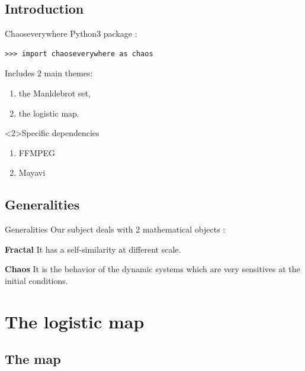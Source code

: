 \documentclass[11pt, compress, tikz]{beamer}
\theoremstyle{definition}
\begin{document}
\subsection{Introduction}
\begin{frame}[fragile]{Chaoseverywhere}
Python3 package : \href{https://github.com/tanglef/chaoseverywhere}{}
%
\begin{verbatim}
>>> import chaoseverywhere as chaos
\end{verbatim}
Includes $2$ main themes:
\begin{enumerate}[label=$\bullet$]
    \item the Manldebrot set,  %
    \item the logistic map. %
\end{enumerate}
\begin{block}<2>{Specific dependencies}
\begin{enumerate}[label=\ding{51}]
\item FFMPEG
\item Mayavi
\end{enumerate}
\end{block}
\end{frame}

\subsection{Generalities}
\begin{frame}[fragile]{Generalities}
Our subject deals with 2 mathematical objects :
\begin{block}{\textbf{Fractal}}
    It has a self-similarity at different scale.
\end{block}
\begin{block}{\textbf{Chaos}}
It is the behavior of the dynamic systems which are very sensitives at the initial conditions.
\end {block}
\end{frame}

\section[Logistic map]{The logistic map}
\subsection{The map}
\end{document}
